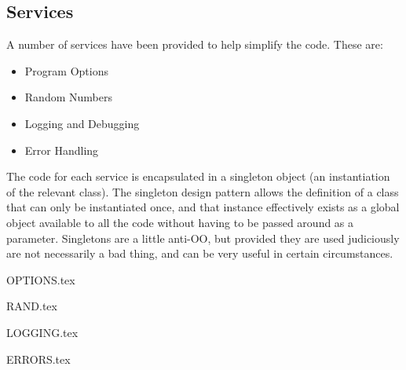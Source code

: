 \subsection{Services}\label{sec:Services}

A number of services have been provided to help simplify the code.  These are:

\begin{itemize}
\item  Program Options

\item  Random Numbers

\item  Logging and Debugging

\item  Error Handling
\end{itemize}

The code for each service is encapsulated in a singleton object (an instantiation of the relevant class).  The singleton design pattern allows the definition of a class that can only be instantiated once, and that instance effectively exists as a global object available to all the code without having to be passed around as a parameter.  Singletons are a little anti-OO, but provided they are used judiciously are not necessarily a bad thing, and can be very useful in certain circumstances.


\clearpage
{OPTIONS.tex}


\clearpage
{RAND.tex}


\clearpage
{LOGGING.tex}


\clearpage
{ERRORS.tex}